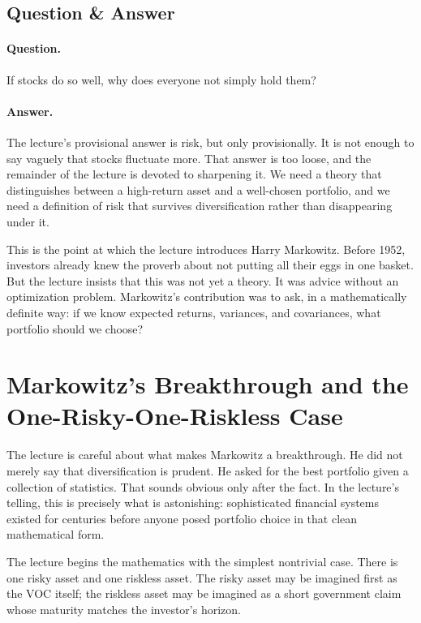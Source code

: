 \subsection{Question \& Answer}

\paragraph{Question.} If stocks do so well, why does everyone not simply hold them?

\paragraph{Answer.} The lecture's provisional answer is risk, but only provisionally. It is not enough to say vaguely that stocks fluctuate more. That answer is too loose, and the remainder of the lecture is devoted to sharpening it. We need a theory that distinguishes between a high-return asset and a well-chosen portfolio, and we need a definition of risk that survives diversification rather than disappearing under it.

This is the point at which the lecture introduces Harry Markowitz. Before 1952, investors already knew the proverb about not putting all their eggs in one basket. But the lecture insists that this was not yet a theory. It was advice without an optimization problem. Markowitz's contribution was to ask, in a mathematically definite way: if we know expected returns, variances, and covariances, what portfolio should we choose?

\section{Markowitz's Breakthrough and the One-Risky-One-Riskless Case}

The lecture is careful about what makes Markowitz a breakthrough. He did not merely say that diversification is prudent. He asked for the best portfolio given a collection of statistics. That sounds obvious only after the fact. In the lecture's telling, this is precisely what is astonishing: sophisticated financial systems existed for centuries before anyone posed portfolio choice in that clean mathematical form.

The lecture begins the mathematics with the simplest nontrivial case. There is one risky asset and one riskless asset. The risky asset may be imagined first as the VOC itself; the riskless asset may be imagined as a short government claim whose maturity matches the investor's horizon.

